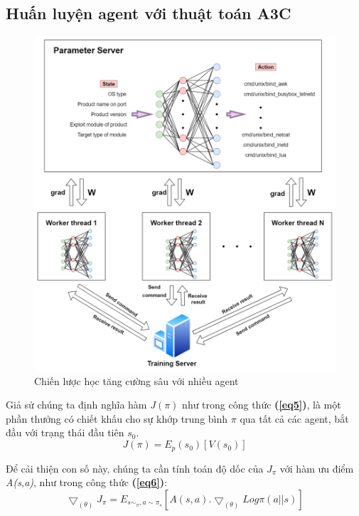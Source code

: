 \subsection{Huấn luyện  agent với thuật toán A3C}

\begin{figure}[!h]
    \centering
    \includegraphics[scale=0.3]{graphics/chapter-3/chap3-RLA3C_AutoPentest.png}
    \caption{Chiến lược học tăng cường sâu với nhiều agent} 
    \label{fig:chap3-RLA3C_AutoPentest}
\end{figure}

Giả sử chúng ta định nghĩa hàm $J(\pi)$ như trong công thức \textbf{(\ref{eq5})}, là một phần thưởng có chiết khấu cho sự khớp trung bình $\pi$ qua tất cả các agent, bắt đầu với trạng thái đầu tiên $s_0$.
\begin{equation}
J(\pi) = E_p(s_0)[V(s_0)]
\label{eq5}
\end{equation}

Để cải thiện con số này, chúng ta cần tính toán độ dốc của $J_{\pi}$ với hàm ưu điểm \textit{A(s,a)}, như trong công thức \textbf{(\ref{eq6})}:
\begin{equation}
\bigtriangledown_{(\theta)}J_{\pi} = E_{s\sim_{\pi},a\sim\pi_{s}} [ A(s,a).\bigtriangledown_{(\theta)} Log \pi(a||s) ]
\label{eq6}
\end{equation}


